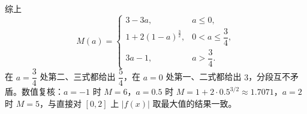 \begin{answer}
综上
\nopagebreak[4]
\[M(a)=\begin{cases}
3-3a,&a\leqslant0,\\[2pt]
1+2(1-a)^{\frac32},&0<a\leqslant\dfrac34,\\[2pt]
3a-1,&a>\dfrac34.
\end{cases}\]
在 $a=\dfrac34$ 处第二、三式都给出 $\dfrac54$，在 $a=0$ 处第一、二式都给出 $3$，分段互不矛盾。数值复核：$a=-1$ 时 $M=6$，$a=0.5$ 时 $M=1+2\cdot0.5^{3/2}\approx1.7071$，$a=2$ 时 $M=5$，与直接对 $[0,2]$ 上 $|f(x)|$ 取最大值的结果一致。



\end{answer}